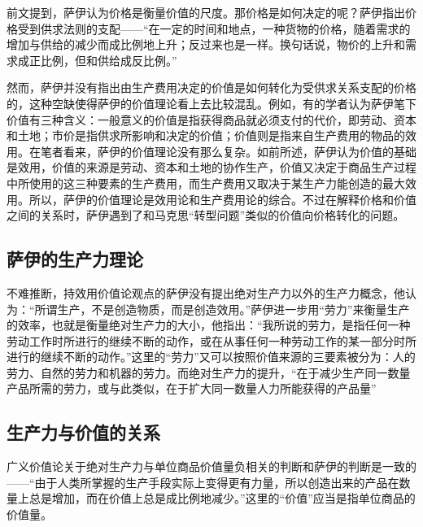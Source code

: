 前文提到，萨伊认为价格是衡量价值的尺度。那价格是如何决定的呢？萨伊指出价格受到供求法则的支配——“在一定的时间和地点，一种货物的价格，随着需求的增加与供给的减少而成比例地上升；反过来也是一样。换句话说，物价的上升和需求成正比例，但和供给成反比例。”\cite[256]{SaYiZhengZhiJingJiXueGaiLunCaiFuDeShengChanFenPeiHeXiaoFei2020}

然而，萨伊并没有指出由生产费用决定的价值是如何转化为受供求关系支配的价格的，这种空缺使得萨伊的价值理论看上去比较混乱。例如，有的学者认为萨伊笔下价值有三种含义：一般意义的价值是指获得商品就必须支付的代价，即劳动、资本和土地；市价是指供求所影响和决定的价值；价值则是指来自生产费用的物品的效用\cite[138]{YanZhiJieXiFangJingJiXueShuoShiJiaoChengDiErBan2013}\cite[175]{CaiJiMingCongGuDianZhengZhiJingJiXueDaoZhongGuoTeSeSheHuiZhuYiZhengZhiJingJiXueJiYuZhongGuoShiJiaoDeZhengZhiJingJiXueYanBianShangCe2023}。在笔者看来，萨伊的价值理论没有那么复杂。如前所述，萨伊认为价值的基础是效用，价值的来源是劳动、资本和土地的协作生产，价值又决定于商品生产过程中所使用的这三种要素的生产费用，而生产费用又取决于某生产力能创造的最大效用。所以，萨伊的价值理论是效用论和生产费用论的综合。不过在解释价格和价值之间的关系时，萨伊遇到了和马克思“转型问题”类似的价值向价格转化的问题。

\subsection{萨伊的生产力理论}

不难推断，持效用价值论观点的萨伊没有提出绝对生产力以外的生产力概念，他认为：“所谓生产，不是创造物质，而是创造效用。”\cite[60]{SaYiZhengZhiJingJiXueGaiLunCaiFuDeShengChanFenPeiHeXiaoFei2020}萨伊进一步用“劳力”来衡量生产的效率，也就是衡量绝对生产力的大小，他指出：“我所说的劳力，是指任何一种劳动工作时所进行的继续不断的动作，或在从事任何一种劳动工作的某一部分时所进行的继续不断的动作。”\cite[90]{SaYiZhengZhiJingJiXueGaiLunCaiFuDeShengChanFenPeiHeXiaoFei2020}这里的“劳力”又可以按照价值来源的三要素被分为：人的劳力、自然的劳力和机器的劳力\cite[90]{SaYiZhengZhiJingJiXueGaiLunCaiFuDeShengChanFenPeiHeXiaoFei2020}。而绝对生产力的提升，“在于减少生产同一数量产品所需的劳力，或与此类似，在于扩大同一数量人力所能获得的产品量”\cite[91]{SaYiZhengZhiJingJiXueGaiLunCaiFuDeShengChanFenPeiHeXiaoFei2020}

\subsection{生产力与价值的关系}

广义价值论关于绝对生产力与单位商品价值量负相关的判断和萨伊的判断是一致的——“由于人类所掌握的生产手段实际上变得更有力量，所以创造出来的产品在数量上总是增加，而在价值上总是成比例地减少。”\cite[369]{SaYiZhengZhiJingJiXueGaiLunCaiFuDeShengChanFenPeiHeXiaoFei2020}这里的“价值”应当是指单位商品的价值量。

